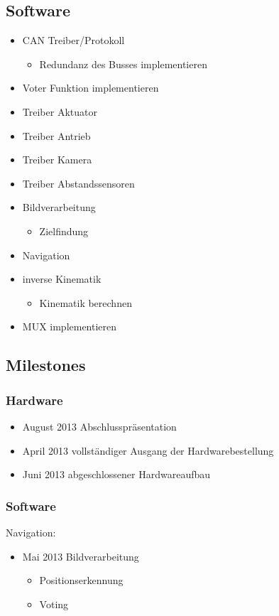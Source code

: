 \subsection{Software}
\begin{itemize}
	\item CAN Treiber/Protokoll
	\begin{itemize}
		\item Redundanz des Busses implementieren
	\end{itemize}
	\item Voter Funktion implementieren
	\item Treiber Aktuator
	\item Treiber Antrieb
	\item Treiber Kamera
	\item Treiber Abstandssensoren
	\item Bildverarbeitung
	\begin{itemize}
		\item Zielfindung
	\end{itemize}
	\item Navigation
	\item inverse Kinematik
	\begin{itemize}
		\item Kinematik berechnen
	\end{itemize}
	\item MUX implementieren
\end{itemize}


\subsection{Milestones}

\subsubsection{Hardware}
\begin{itemize}
	\item August 2013 Abschlusspräsentation
	\item April 2013 vollständiger Ausgang der Hardwarebestellung
	\item Juni 2013 abgeschlossener Hardwareaufbau
	\end{itemize}


\subsubsection{Software}
	Navigation:
\begin{itemize}
	\item Mai 2013 Bildverarbeitung
	\begin{itemize}
		\item Positionserkennung
		\item Voting
	\end{itemize}
	\end{itemize}

